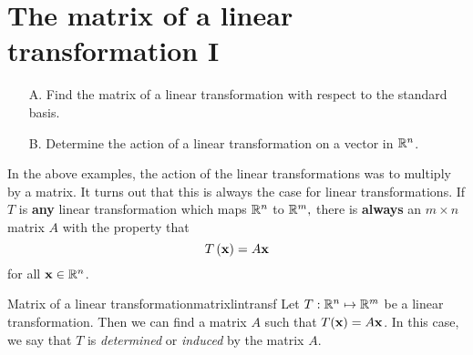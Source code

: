 \section{The matrix of a linear transformation I}

\begin{outcome}
\begin{enumerate}
\item[A.] Find the matrix of a linear transformation with respect to the standard basis.

\item[B.] Determine the action of a linear transformation on a vector in $\mathbb{R}^n$.   
\end{enumerate}
\end{outcome}

In the above examples, the action of the linear transformations was to multiply by a matrix. 
It turns out that this is always the case for linear transformations.
If $T$ is \textbf{any} linear transformation which maps $\mathbb{R}^{n}$ to 
$\mathbb{R}^{m},$ there is \textbf{always} an $m\times n$ matrix $A$ with the
property that
\begin{equation}
T\left({\bf x}\right) = A{\bf x} \label{matrixoftransf}
\end{equation}
for all ${\bf x} \in \mathbb{R}^{n}$.

\begin{theorem}{Matrix of a linear transformation}{matrixlintransf}
Let $T:\mathbb{R}^{n}\mapsto \mathbb{R}^{m}$ be a linear transformation. Then we can find a matrix $A$ such that $T({\bf x}) = A{\bf x}$. 
 In this case, we say that $T$ is {\em determined\em} or {\em induced\em}
by the matrix $A$.
\end{theorem}

